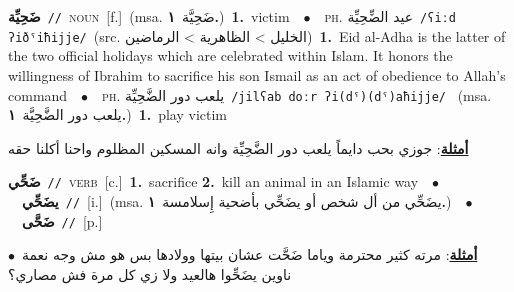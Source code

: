 \documentclass[10pt,a4paper,twoside]{article} %
\begin{document}
\begin{multicols}{2}
{{{{{{{{{\setlength\topsep{0pt}\textbf{\foreignlanguage{arabic}{ضَحِيِّة}}\ {\color{gray}\texttt{//}\color{black}}\ \textsc{noun}\ [f.]\ \color{gray}(msa. \foreignlanguage{arabic}{ضَحِيَّة}~\foreignlanguage{arabic}{\textbf{١.}})\color{black}\ \textbf{1.}~victim\ \ $\bullet$\ \ \textsc{ph.} \color{gray} \foreignlanguage{arabic}{عيد الضِّحِيِّة}\color{black}\ {\color{gray}\texttt{/{\sffamily ʕiːd ʔiðˤiħijje}/}\color{black}}\ \color{gray}(src. \foreignlanguage{arabic}{الخليل > الظاهرية > الرماضين})\color{black}\ \textbf{1.}~Eid al-Adha is the latter of the two official holidays which are celebrated within Islam. It honors the willingness of Ibrahim to sacrifice his son Ismail as an act of obedience to Allah's command\ \ $\bullet$\ \ \textsc{ph.} \color{gray} \foreignlanguage{arabic}{يلعب دور الضَّحِيِّة}\color{black}\ {\color{gray}\texttt{/{\sffamily jilʕab doːr ʔi(dˤ)(dˤ)aħijje}/}\color{black}}\ \color{gray} (msa. \foreignlanguage{arabic}{يلعب دور الضَّحِيَّة}~\foreignlanguage{arabic}{\textbf{١.}})\color{black}\ \textbf{1.}~play victim\  \begin{flushright}\color{gray}\foreignlanguage{arabic}{\textbf{\underline{\foreignlanguage{arabic}{أمثلة}}}: جوزي بحب دايماً يلعب دور الضَّحِيِّة وانه المسكين المظلوم واحنا أكلنا حقه}\end{flushright}\color{black}} \vspace{2mm}

{\setlength\topsep{0pt}\textbf{\foreignlanguage{arabic}{ضَحِّي}}\ {\color{gray}\texttt{//}\color{black}}\ \textsc{verb}\ [c.]\ \textbf{1.}~sacrifice  \textbf{2.}~kill an animal in an Islamic way\ \ $\bullet$\ \ \setlength\topsep{0pt}\textbf{\foreignlanguage{arabic}{يضَحِّي}}\ {\color{gray}\texttt{//}\color{black}}\ [i.]\ \color{gray}(msa. \foreignlanguage{arabic}{يضَحِّي من أل شخص أو يضَحِّي بأضحية إِسلامسة}~\foreignlanguage{arabic}{\textbf{١.}})\color{black}\ \ $\bullet$\ \ \setlength\topsep{0pt}\textbf{\foreignlanguage{arabic}{ضَحَّى}}\ {\color{gray}\texttt{//}\color{black}}\ [p.]\  \begin{flushright}\color{gray}\foreignlanguage{arabic}{\textbf{\underline{\foreignlanguage{arabic}{أمثلة}}}: مرته كثير محترمة وياما ضَحَّت عشان بيتها وولادها بس هو مش وجه نعمة\ $\bullet$\ \  ناوين يضَحِّوا هالعيد ولا زي كل مرة فش مصاري؟}\end{flushright}\color{black}} \vspace{2mm}

}}}}}}}}
\end{multicols}
\end{document}
